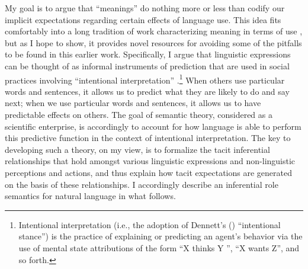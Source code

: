 My goal is to argue that ``meanings'' do nothing more or less than codify our implicit expectations regarding certain effects of language use. This idea fits comfortably into a long tradition of work characterizing meaning in terms of use \citep{Sellars:1954,Wittgenstein:1953,Sellars:1953,Harman:1982,Block:1986,Brandom:1994,Brandom:2000,Brandom:2009,Horwich:2005}, but as I hope to show, it provides novel resources for avoiding some of the pitfalls to be found in this earlier work. Specifically, I argue that linguistic expressions can be thought of as informal instruments of prediction that are used in social practices involving ``intentional interpretation'' \citep{Dennett:1987,Brandom:1994}.\footnote{Intentional interpretation (i.e., the adoption of Dennett's (\citeyear{Dennett:1987,Dennett:1991}) ``intentional stance'') is the practice of explaining or predicting an agent’s behavior via the use of mental state attributions of the form “X thinks Y ”, “X wants Z”, and so forth.} When others use particular words and sentences, it allows us to predict what they are likely to do and say next; when we use particular words and sentences, it allows us to have predictable effects on others. The goal of semantic theory, considered as a scientific enterprise, is accordingly to account for how language is able to perform this predictive function in the context of intentional interpretation. The key to developing such a theory, on my view, is to formalize the tacit inferential relationships that hold amongst various linguistic expressions and non-linguistic perceptions and actions, and thus explain how tacit expectations are generated on the basis of these relationships. I accordingly describe an inferential role semantics for natural language in what follows. 

